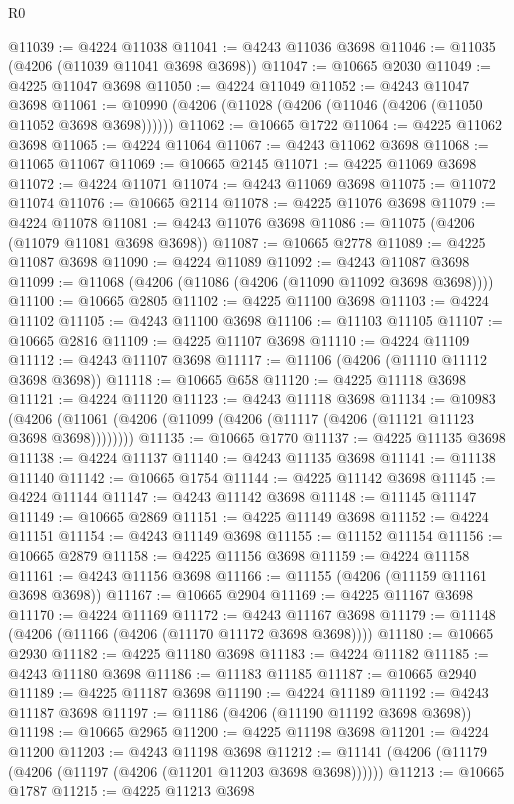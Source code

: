 \begin{lexlean}{R0}
\begin{coremodule}
@11039 := @4224 @11038
@11041 := @4243 @11036 @3698
@11046 := @11035 (@4206 (@11039 @11041 @3698 @3698))
@11047 := @10665 @2030
@11049 := @4225 @11047 @3698
@11050 := @4224 @11049
@11052 := @4243 @11047 @3698
@11061 := @10990 (@4206 (@11028 (@4206 (@11046 (@4206 (@11050 @11052 @3698 @3698))))))
@11062 := @10665 @1722
@11064 := @4225 @11062 @3698
@11065 := @4224 @11064
@11067 := @4243 @11062 @3698
@11068 := @11065 @11067
@11069 := @10665 @2145
@11071 := @4225 @11069 @3698
@11072 := @4224 @11071
@11074 := @4243 @11069 @3698
@11075 := @11072 @11074
@11076 := @10665 @2114
@11078 := @4225 @11076 @3698
@11079 := @4224 @11078
@11081 := @4243 @11076 @3698
@11086 := @11075 (@4206 (@11079 @11081 @3698 @3698))
@11087 := @10665 @2778
@11089 := @4225 @11087 @3698
@11090 := @4224 @11089
@11092 := @4243 @11087 @3698
@11099 := @11068 (@4206 (@11086 (@4206 (@11090 @11092 @3698 @3698))))
@11100 := @10665 @2805
@11102 := @4225 @11100 @3698
@11103 := @4224 @11102
@11105 := @4243 @11100 @3698
@11106 := @11103 @11105
@11107 := @10665 @2816
@11109 := @4225 @11107 @3698
@11110 := @4224 @11109
@11112 := @4243 @11107 @3698
@11117 := @11106 (@4206 (@11110 @11112 @3698 @3698))
@11118 := @10665 @658
@11120 := @4225 @11118 @3698
@11121 := @4224 @11120
@11123 := @4243 @11118 @3698
@11134 := @10983
    (@4206 (@11061 (@4206 (@11099 (@4206 (@11117 (@4206 (@11121 @11123 @3698 @3698))))))))
@11135 := @10665 @1770
@11137 := @4225 @11135 @3698
@11138 := @4224 @11137
@11140 := @4243 @11135 @3698
@11141 := @11138 @11140
@11142 := @10665 @1754
@11144 := @4225 @11142 @3698
@11145 := @4224 @11144
@11147 := @4243 @11142 @3698
@11148 := @11145 @11147
@11149 := @10665 @2869
@11151 := @4225 @11149 @3698
@11152 := @4224 @11151
@11154 := @4243 @11149 @3698
@11155 := @11152 @11154
@11156 := @10665 @2879
@11158 := @4225 @11156 @3698
@11159 := @4224 @11158
@11161 := @4243 @11156 @3698
@11166 := @11155 (@4206 (@11159 @11161 @3698 @3698))
@11167 := @10665 @2904
@11169 := @4225 @11167 @3698
@11170 := @4224 @11169
@11172 := @4243 @11167 @3698
@11179 := @11148 (@4206 (@11166 (@4206 (@11170 @11172 @3698 @3698))))
@11180 := @10665 @2930
@11182 := @4225 @11180 @3698
@11183 := @4224 @11182
@11185 := @4243 @11180 @3698
@11186 := @11183 @11185
@11187 := @10665 @2940
@11189 := @4225 @11187 @3698
@11190 := @4224 @11189
@11192 := @4243 @11187 @3698
@11197 := @11186 (@4206 (@11190 @11192 @3698 @3698))
@11198 := @10665 @2965
@11200 := @4225 @11198 @3698
@11201 := @4224 @11200
@11203 := @4243 @11198 @3698
@11212 := @11141 (@4206 (@11179 (@4206 (@11197 (@4206 (@11201 @11203 @3698 @3698))))))
@11213 := @10665 @1787
@11215 := @4225 @11213 @3698

\end{coremodule}
\end{lexlean}
